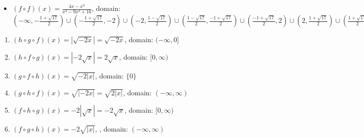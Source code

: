 \begin{enumerate}
\begin{itemize}
\item  $(f \circ f)(x) = \frac{4x-x^3}{x^4-9x^2+16}$, domain: $\left(-\infty, -\frac{1+\sqrt{17}}{2}\right) \cup \left(-\frac{1+\sqrt{17}}{2}, -2\right) \cup \left(-2, \frac{1-\sqrt{17}}{2}\right) \cup \left(\frac{1-\sqrt{17}}{2}, \frac{-1+\sqrt{17}}{2}\right) \cup \left(\frac{-1+\sqrt{17}}{2}, 2\right) \cup \left(2, \frac{1+\sqrt{17}}{2} \right) \cup \left(\frac{1+\sqrt{17}}{2}, \infty\right)$

\end{itemize}
\setcounter{HW}{\value{enumi}}
\end{enumerate}



\begin{enumerate}
\setcounter{enumi}{\value{HW}}

\item $(h\circ g \circ f)(x)= |\sqrt{-2x}|= \sqrt{-2x}$, domain: $(-\infty, 0]$ 

\item $(h\circ f \circ g)(x) = |-2\sqrt{x}|= 2\sqrt{x}$, domain: $[0,\infty)$

\item $(g\circ f \circ h)(x) = \sqrt{-2|x|}$, domain:  $\{0\}$

\item $(g\circ h \circ f)(x) = \sqrt{|-2x|} = \sqrt{2|x|}$, domain: $(-\infty, \infty)$ 

\item $(f\circ h \circ g)(x) = -2|\sqrt{x}| = -2\sqrt{x}$, domain: $[0,\infty)$

\item $(f\circ g \circ h)(x) = -2\sqrt{|x|}$, , domain: $(-\infty,\infty)$

\setcounter{HW}{\value{enumi}}
\end{enumerate}





